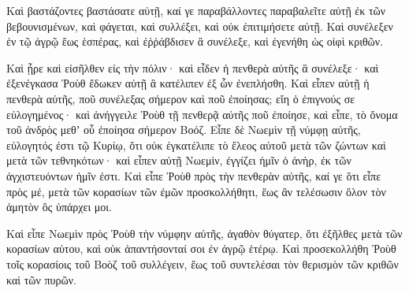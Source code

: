 {Καὶ βαστάζοντες βαστάσατε αὐτῇ, καί γε παραβάλλοντες παραβαλεῖτε αὐτῇ ἐκ τῶν βεβουνισμένων, καὶ φάγεται, καὶ συλλέξει, καὶ οὐκ ἐπιτιμήσετε αὐτῇ.
Καὶ συνέλεξεν ἐν τῷ ἀγρῷ ἕως ἑσπέρας, καὶ ἐῤῥάβδισεν ἃ συνέλεξε, καὶ ἐγενήθη ὡς οἰφὶ κριθῶν.
\par }{\PP {}Καὶ ᾖρε καὶ εἰσῆλθεν εἰς τὴν πόλιν· καὶ εἶδεν ἡ πενθερὰ αὐτῆς ἃ συνέλεξε· καὶ ἐξενέγκασα Ῥοὺθ ἔδωκεν αὐτῇ ἃ κατέλιπεν ἐξ ὧν ἐνεπλήσθη.
Καὶ εἶπεν αὐτῇ ἡ πενθερὰ αὐτῆς, ποῦ συνέλεξας σήμερον καὶ ποῦ ἐποίησας; εἴη ὁ ἐπιγνούς σε εὐλογημένος· καὶ ἀνήγγειλε Ῥοὺθ τῇ πενθερᾷ αὐτῆς ποῦ ἐποίησε, καὶ εἶπε, τὸ ὄνομα τοῦ ἀνδρὸς μεθʼ οὗ ἐποίησα σήμερον Βοόζ.
Εἶπε δὲ Νωεμὶν τῇ νύμφῃ αὐτῆς, εὐλογητός ἐστι τῷ Κυρίῳ, ὅτι οὐκ ἐγκατέλιπε τὸ ἔλεος αὐτοῦ μετὰ τῶν ζώντων καὶ μετὰ τῶν τεθνηκότων· καὶ εἶπεν αὐτῇ Νωεμὶν, ἐγγίζει ἡμῖν ὁ ἀνὴρ, ἐκ τῶν ἀγχιστευόντων ἡμῖν ἐστι.
Καὶ εἶπε Ῥοὺθ πρὸς τὴν πενθερὰν αὐτῆς, καί γε ὅτι εἶπε πρὸς μέ, μετὰ τῶν κορασίων τῶν ἐμῶν προσκολλήθητι, ἕως ἂν τελέσωσιν ὅλον τὸν ἀμητὸν ὃς ὑπάρχει μοι.
\par }{\PP {}Καὶ εἶπε Νωεμὶν πρὸς Ῥοὺθ τὴν νύμφην αὐτῆς, ἀγαθὸν θύγατερ, ὅτι ἐξῆλθες μετὰ τῶν κορασίων αὐτου, καὶ οὐκ ἀπαντήσονταί σοι ἐν ἀγρῷ ἑτέρῳ.
Καὶ προσεκολλήθη Ῥοὺθ τοῖς κορασίοις τοῦ Βοὸζ τοῦ συλλέγειν, ἕως τοῦ συντελέσαι τὸν θερισμὸν τῶν κριθῶν καὶ τῶν πυρῶν.

}
